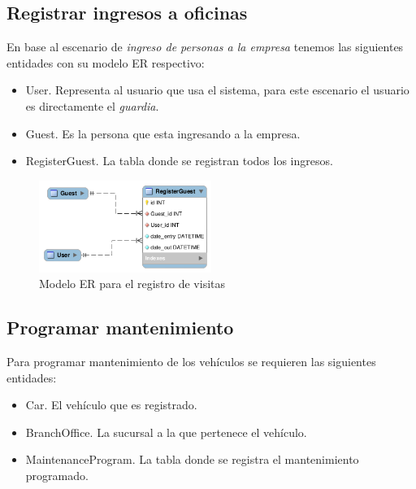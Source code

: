 \newpage
\subsection{Registrar ingresos a oficinas}
En base al escenario de {\it ingreso de personas a la empresa} tenemos las
siguientes entidades con su modelo ER respectivo:

\begin{itemize}
    \item User. Representa al usuario que usa el sistema, para este escenario el
      usuario es directamente el {\it guardia}.
    \item Guest. Es la persona que esta ingresando a la empresa.
    \item RegisterGuest. La tabla donde se registran todos los ingresos.
\end{itemize}

\begin{figure}[h]
  \begin{center}
    \includegraphics[width=0.5\textwidth]{figures/chapter4/er_reg_visitas.png}
    \caption[Modelo ER - Registro de visitas]{Modelo ER para el registro de visitas}
  \end{center}
\end{figure}

\subsection{Programar mantenimiento}
Para programar mantenimiento de los vehículos se requieren las siguientes
entidades:

\begin{itemize}
    \item Car. El vehículo que es registrado.
    \item BranchOffice. La sucursal a la que pertenece el vehículo.
    \item MaintenanceProgram. La tabla donde se registra el mantenimiento programado.
\end{itemize}

